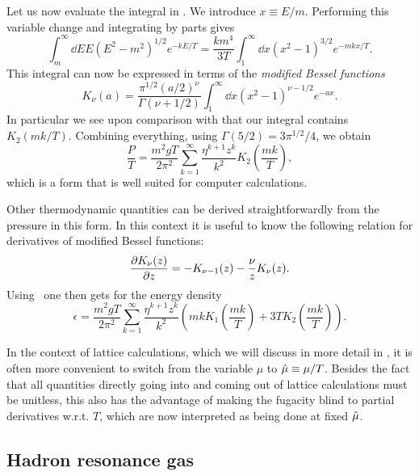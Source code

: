 Let us now evaluate the integral in . We introduce
$x\equiv E/m$. Performing this variable change and integrating by parts gives
\begin{equation}\label{eq:pressint}
  \int_m^\infty\dd{E}E\left(E^2-m^2\right)^{1/2}e^{-kE/T}
  =\frac{km^4}{3T}\int_1^\infty\dd x\left(x^2-1\right)^{3/2}e^{-mkx/T}.
\end{equation}
This integral can now be expressed in terms of the
{\it modified Bessel functions}
\begin{equation}
  K_\nu(a)=\frac{\pi^{1/2}(a/2)^\nu}{\Gamma(\nu+1/2)}
             \int_1^\infty\dd x(x^2-1)^{\nu-1/2}e^{-ax}.
\end{equation}
In particular we see upon comparison with 
that our integral contains $K_2(mk/T)$. Combining everything,
using $\Gamma(5/2)=3\pi^{1/2}/4$, we obtain
\begin{equation}\label{eq:pressrelQM}
  \frac{P}{T}=\frac{m^2gT}{2\pi^2}\sum_{k=1}^\infty\frac{\eta^{k+1}z^k}{k^2}
                         K_2\left(\frac{mk}{T}\right),
\end{equation}
which is a form that is well suited for computer calculations.

Other thermodynamic quantities can be derived straightforwardly
from the pressure in this form. In this context it is useful to know
the following relation for derivatives of modified Bessel functions:
\begin{equation}
  \pder[K_\nu(z)]{z}=-K_{\nu-1}(z)-\frac{\nu}{z}K_\nu(z).
\end{equation}
Using~ one then gets for the energy density
\begin{equation}\label{eq:edensityQM}
  \epsilon=\frac{m^2gT}{2\pi^2}\sum_{k=1}^\infty\frac{\eta^{k+1}z^k}{k^2}
              \left( mk K_1\left(\frac{mk}{T}\right) 
                    + 3TK_2\left(\frac{mk}{T}\right) \right).
\end{equation}

In the context of lattice calculations, which we will discuss in more
detail in , it is often more convenient to switch
from the variable $\mu$ to $\muh\equiv\mu/T$. Besides the fact that
all quantities directly going into and coming out of lattice calculations
must be unitless, this also has the advantage of making the
fugacity blind to partial derivatives w.r.t. $T$, which are now
interpreted as being done at fixed $\muh$.

\subsection{Hadron resonance gas}\label{sec:HRG}


